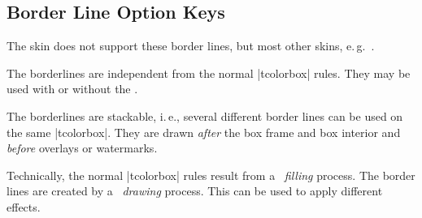 \clearpage
\subsection{Border Line Option Keys}\label{subsec:borderline}
The skin  does not support these border lines,
but most other skins, e.\,g.\ .

The borderlines are independent from the normal |tcolorbox| rules.
They may be used with or without the .

The borderlines are stackable, i.\,e., several different border lines can be
used on the same |tcolorbox|. They are drawn \emph{after} the box frame and box
interior and \emph{before} overlays or watermarks.

\begin{marker}
Technically, the normal |tcolorbox| rules result from a \tikzname\  \emph{filling}
process. The border lines are created by a \tikzname\  \emph{drawing} process.
This can be used to apply different effects.
\end{marker}



